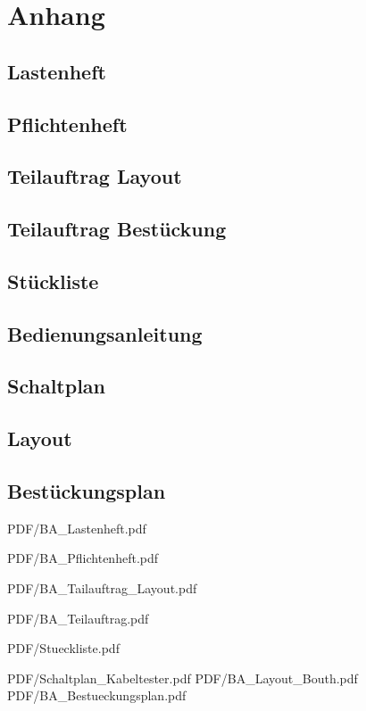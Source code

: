 \section{Anhang}

\subsection{Lastenheft}
\subsection{Pflichtenheft}
\subsection{Teilauftrag Layout}
\subsection{Teilauftrag Bestückung}
\subsection{Stückliste}
\subsection{Bedienungsanleitung}
\subsection{Schaltplan}
\subsection{Layout}
\subsection{Bestückungsplan}



 {PDF/BA_Lastenheft.pdf}

 {PDF/BA_Pflichtenheft.pdf}

 {PDF/BA_Tailauftrag_Layout.pdf}

 {PDF/BA_Teilauftrag.pdf}

 {PDF/Stueckliste.pdf}

 {PDF/Schaltplan_Kabeltester.pdf}
%
 {PDF/BA_Layout_Bouth.pdf}
%
 {PDF/BA_Bestueckungsplan.pdf}



